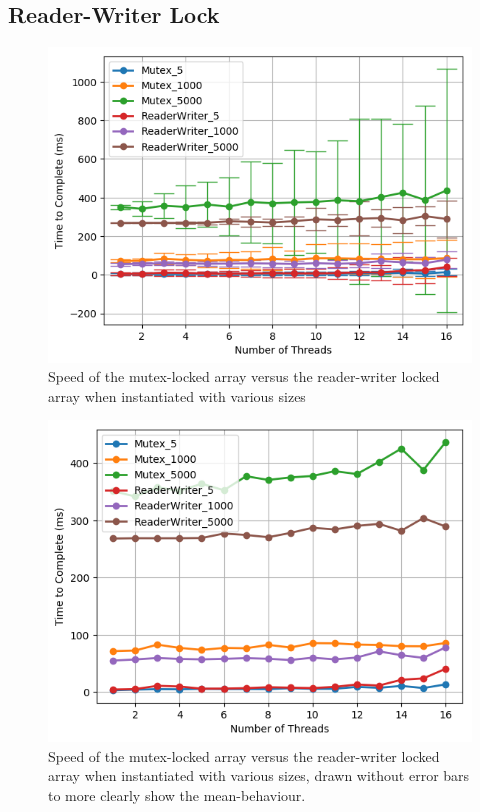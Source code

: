 \documentclass[11pt]{article}
\begin{document}
\subsection{Reader-Writer Lock}
\begin{figure}
\centering
\includegraphics[scale=0.65]{step5_1.png}
\caption{Speed of the mutex-locked array versus the reader-writer locked array when instantiated with various sizes}
\label{fig:step5_1}
\end{figure}

\begin{figure}
\centering
\includegraphics[scale=0.65]{step5_2.png}
\caption{Speed of the mutex-locked array versus the reader-writer locked array when instantiated with various sizes, drawn without error bars to more clearly show the mean-behaviour.}
\label{fig:step5_2}
\end{figure}
\end{document}
